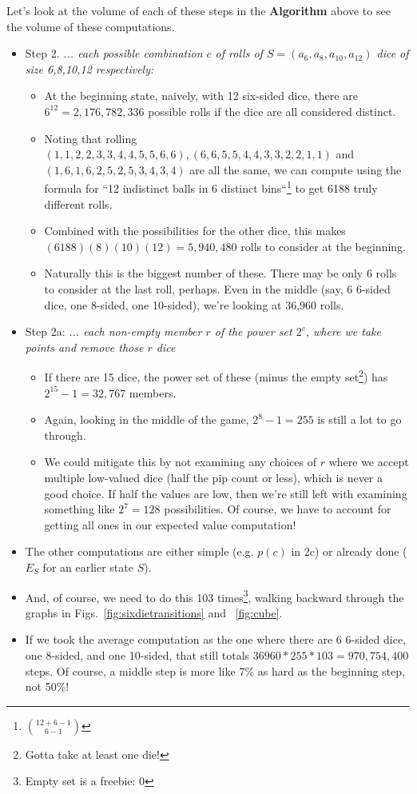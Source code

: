 \documentclass[11pt, oneside]{article} 	%
\begin{document}
Let's look at the volume of each of these steps in the \textbf{Algorithm} above to see the volume of these computations.
\begin{itemize}
\item Step 2. \emph{... each possible combination $c$ of rolls of $S = (a_6, a_8, a_{10}, a_{12})$ dice of size 6,8,10,12 respectively:}

  \begin{itemize}
  \item At the beginning state, naively, with 12 six-sided dice, there are $6^{12} = 2,176,782,336$ possible rolls if the dice are all considered distinct.
  \item Noting that rolling $(1,1,2,2,3,3,4,4,5,5,6,6), (6,6,5,5,4,4,3,3,2,2,1,1)$ and $(1,6,1,6,2,5,2,5,3,4,3,4) $ are all the same, we can compute using the formula for ``12 indistinct balls in 6 distinct bins``\footnote{${12 + 6 - 1 \choose 6 - 1}$} to get 6188 truly different rolls.
  \item Combined with the possibilities for the other dice, this makes $(6188)(8)(10)(12) = 5,940,480$ rolls to consider at the beginning. 
  \item Naturally this is the biggest number of these. There may be only 6 rolls to consider at the last roll, perhaps. Even in the middle (say, 6 6-sided dice, one 8-sided, one 10-sided), we're looking at 36,960 rolls.
  \end{itemize}
  
    
\item Step 2a: \emph{... each non-empty member $r$ of the power set $2^c$, where we take points and remove those $r$ dice}
  \begin{itemize}
  \item If there are 15 dice, the power set of these (minus the empty set\footnote{Gotta take at least one die!}) has $2^{15} - 1 = 32,767$ members.
  \item Again, looking in the middle of the game, $2^8 - 1 = 255$	 is still a lot to go through.
  \item We could mitigate this by not examining any choices  of $r$ where we accept multiple low-valued dice (half the pip count or less), which is never a good choice. If half the values are low, then we're still left with examining something like $2^7=128$ possibilities. Of course, we have to account for getting all ones in our expected value computation!
  \end{itemize}
\item The other computations are either simple (e.g. $p(c)$ in 2c) or already done ($E_S$ for an earlier state $S$).
\item And, of course, we need to do this 103 times\footnote{Empty set is a freebie: 0}, walking backward through the graphs in Figs.~\ref{fig:sixdietransitions} and ~\ref{fig:cube}.
\item If we took the average computation as the one where there are 6 6-sided dice, one 8-sided, and one 10-sided, that still totals $36960*255*103 = 970,754,400$ steps. Of course, a middle step is more like 7\% as hard as the beginning step, not 50\%!
\end{itemize}
\end{document}
